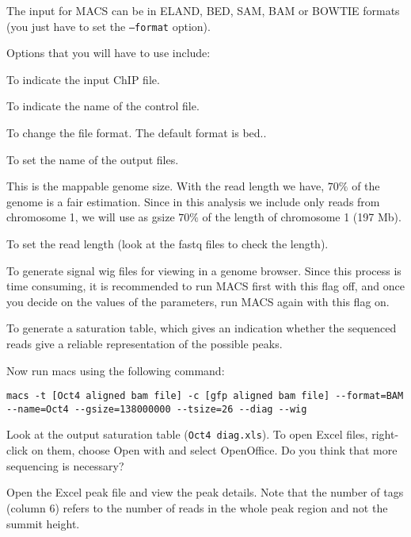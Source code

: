 \begin{information}
The input for MACS can be in ELAND, BED, SAM, BAM or BOWTIE formats (you just
have to set the \texttt{--format} option).

Options that you will have to use include: 

\begin{description}[style=multiline,labelindent=0cm,align=right,leftmargin=\descriptionlabelspace,rightmargin=1.5cm,font=\ttfamily]
 \item[-t] To indicate the input ChIP file.
 \item[-c] To indicate the name of the control file.
 \item[--format] To change the file format. The default format is bed..
 \item[--name] To set the name of the output files.
 \item[--gsize] This is the mappable genome size. With the read length we have,
 $70\%$ of the genome is a fair estimation. Since in this analysis we include
 only reads from chromosome 1, we will use as gsize $70\%$ of the length of
 chromosome 1 (197 Mb).
 \item[--tsize] To set the read length (look at the fastq files to check the
 length).
 \item[--wig] To generate signal wig files for viewing in a genome browser.
 Since this process is time consuming, it is recommended to run MACS first with
 this flag off, and once you decide on the values of the parameters, run MACS
 again with this flag on.
 \item[--diag] To generate a saturation table, which gives an indication whether
 the sequenced reads give a reliable representation of the possible peaks.
\end{description}
\end{information}

\begin{steps}
Now run macs using the following command:

\begin{lstlisting}
macs -t [Oct4 aligned bam file] -c [gfp aligned bam file] --format=BAM --name=Oct4 --gsize=138000000 --tsize=26 --diag --wig 
\end{lstlisting}

Look at the output saturation table (\texttt{Oct4 diag.xls}). To open Excel
files, right-click on them, choose Open with and select OpenOffice. Do you think
that more sequencing is necessary?

Open the Excel peak file and view the peak details. Note that the number of tags
(column 6) refers to the number of reads in the whole peak region and not the
summit height.

\end{steps}

